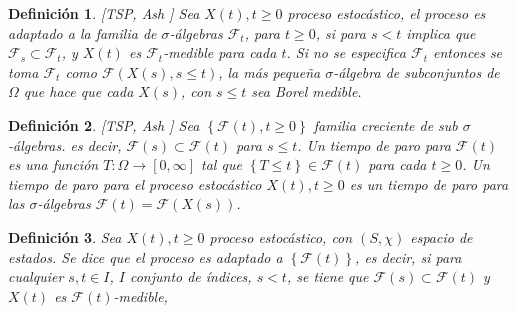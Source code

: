 \documentclass{article}
\newtheorem{Def}{Definición}
\begin{document}
\begin{Def}\label{Def.Proc.Adaptado}[TSP, Ash \cite{RBA}]
Sea $X\left(t\right),t\geq0$ proceso estoc\'astico, el proceso es adaptado a la familia de $\sigma$-\'algebras $\mathcal{F}_{t}$, para $t\geq0$, si para $s<t$ implica que $\mathcal{F}_{s}\subset\mathcal{F}_{t}$, y $X\left(t\right)$ es $\mathcal{F}_{t}$-medible para cada $t$. Si no se especifica $\mathcal{F}_{t}$ entonces se toma $\mathcal{F}_{t}$ como $\mathcal{F}\left(X\left(s\right),s\leq t\right)$, la m\'as peque\~na $\sigma$-\'algebra de subconjuntos de $\Omega$ que hace que cada $X\left(s\right)$, con $s\leq t$ sea Borel medible.
\end{Def}


\begin{Def}\label{Def.Tiempo.Paro}[TSP, Ash \cite{RBA}]
Sea $\left\{\mathcal{F}\left(t\right),t\geq0\right\}$ familia creciente de sub $\sigma$-\'algebras. es decir, $\mathcal{F}\left(s\right)\subset\mathcal{F}\left(t\right)$ para $s\leq t$. Un tiempo de paro para $\mathcal{F}\left(t\right)$ es una funci\'on $T:\Omega\rightarrow\left[0,\infty\right]$ tal que $\left\{T\leq t\right\}\in\mathcal{F}\left(t\right)$ para cada $t\geq0$. Un tiempo de paro para el proceso estoc\'astico $X\left(t\right),t\geq0$ es un tiempo de paro para las $\sigma$-\'algebras $\mathcal{F}\left(t\right)=\mathcal{F}\left(X\left(s\right)\right)$.
\end{Def}

\begin{Def}
Sea $X\left(t\right),t\geq0$ proceso estoc\'astico, con $\left(S,\chi\right)$ espacio de estados. Se dice que el proceso es adaptado a $\left\{\mathcal{F}\left(t\right)\right\}$, es decir, si para cualquier $s,t\in I$, $I$ conjunto de \'indices, $s<t$, se tiene que $\mathcal{F}\left(s\right)\subset\mathcal{F}\left(t\right)$ y $X\left(t\right)$ es $\mathcal{F}\left(t\right)$-medible,
\end{Def}
\end{document}
